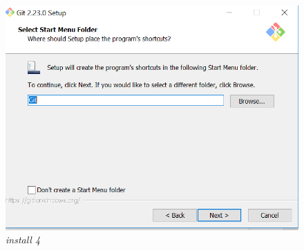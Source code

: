 \begin{enumerate}
\begin{figure}[H]
    \centering
    \includegraphics[scale=0.5]{figures/4.png}
    \caption{\textit{install 4}}
    \label{4}
\end{figure}

\end{enumerate}





